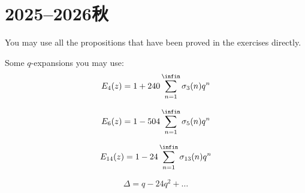 
\section{2025--2026秋}
You may use all the propositions that have been proved in the exercises directly.

Some \(q\)-expansions you may use:
    \[
        E_4(z) = 1 + 240 \sum_{n=1}^{\infin} \sigma_3 (n) q^n
    \]

    \[
        E_6(z) = 1 - 504 \sum_{n=1}^{\infin} \sigma_5 (n) q^n
    \]

    \[
        E_{14}(z) = 1 - 24 \sum_{n=1}^{\infin} \sigma_{13} (n) q^n
    \]

    \[
        \Delta = q - 24 q^2 + \dots
    \]


